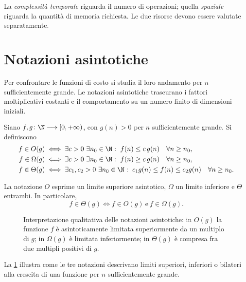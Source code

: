 La \emph{complessità temporale} riguarda il numero di operazioni;
quella \emph{spaziale} riguarda la quantità di memoria richiesta. Le
due risorse devono essere valutate separatamente.

\section{Notazioni asintotiche}
\label{sec:fi-complessita-asintotica}

Per confrontare le funzioni di costo si studia il loro andamento per
\(n\) sufficientemente grande. Le notazioni asintotiche trascurano i
fattori moltiplicativi costanti e il comportamento su un numero finito
di dimensioni iniziali.

\begin{definition}
\label{def:fi-notazioni-asintotiche}
Siano \(f,g\colon\N\longrightarrow[0,+\infty)\), con \(g(n)>0\)
per \(n\) sufficientemente grande. Si definiscono
\begin{align*}
  f\in O(g)
  &\iff \exists c>0\ \exists n_0\in\N:\
      f(n)\le c\,g(n)\quad\forall n\ge n_0,\\
  f\in\Omega(g)
  &\iff \exists c>0\ \exists n_0\in\N:\
      f(n)\ge c\,g(n)\quad\forall n\ge n_0,\\
  f\in\Theta(g)
  &\iff \exists c_1,c_2>0\ \exists n_0\in\N:\
      c_1g(n)\le f(n)\le c_2g(n)\quad\forall n\ge n_0.
\end{align*}
\end{definition}

La notazione \(O\) esprime un limite superiore asintotico, \(\Omega\)
un limite inferiore e \(\Theta\) entrambi. In particolare,
\[
  f\in\Theta(g)
  \iff f\in O(g)\ \text{e}\ f\in\Omega(g).
\]

\begin{figure}[htbp]
  \centering
  
  \caption{Interpretazione qualitativa delle notazioni asintotiche:
  in \(O(g)\) la funzione \(f\) è asintoticamente limitata superiormente
  da un multiplo di \(g\); in \(\Omega(g)\) è limitata inferiormente;
  in \(\Theta(g)\) è compresa fra due multipli positivi di \(g\).}
  \label{fig:fi-notazioni-asintotiche}
\end{figure}

La \cref{fig:fi-notazioni-asintotiche} illustra come le tre notazioni
descrivano limiti superiori, inferiori o bilateri alla crescita
di una funzione per \(n\) sufficientemente grande.

